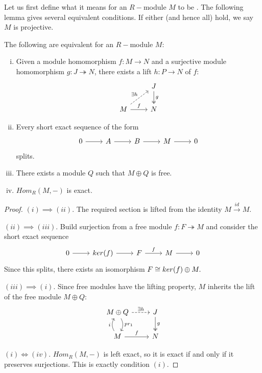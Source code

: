 Let us first define what it means for an $R-$module $M$ to be . The following lemma gives several equivalent conditions. If either (and hence all) hold, we say $M$ is projective.
\begin{lemma} The following are equivalent for an $R-$module $M$:
\begin{enumerate}[(i)]
    \item Given a module homomorphism $f:M\rightarrow N$ and a surjective module homomorphism $g:J 	\twoheadrightarrow N$, there exists a lift $h:P\rightarrow N$ of $f$:
\[\begin{tikzcd}
                                                 & J \arrow[d, "g", two heads] \\
M \arrow[r, "f"] \arrow[ru, "\exists h", dashed] & N               
\end{tikzcd}\]
\item Every short exact sequence of the form
\[\begin{tikzcd}
0 \arrow[r] & A \arrow[r] & B \arrow[r] & M \arrow[r] & 0
\end{tikzcd}\]
splits.
\item There exists a module $Q$ such that $M\oplus Q$ is free.
\item $Hom_R(M,-)$ is exact.
\end{enumerate}
\end{lemma}
\begin{proof}

$(i)\implies (ii)$. The required section is lifted from the identity $M\xrightarrow{id}M$.

$(ii)\implies (iii)$. Build surjection from a free module $f:F\twoheadrightarrow M$ and consider the short exact sequence
\[\begin{tikzcd}
0 \arrow[r] & ker(f) \arrow[r] & F \arrow[r, "f"] & M \arrow[r] & 0
\end{tikzcd}\]
Since this splits, there exists an isomorphism $F\cong ker(f)\oplus M.$

$(iii) \implies (i)$. Since free modules have the lifting property, $M$ inherits the lift of the free module $M\oplus Q$: %
\[\begin{tikzcd}
M\oplus Q \arrow[d, "pr_1", bend left] \arrow[r, "\exists h", dashed] & J \arrow[d, "g", two heads] \\
M \arrow[u, "i", bend left] \arrow[r, "f"]                            & N                          
\end{tikzcd}\]

$(i)\iff (iv)$. $Hom_R(M,-)$ is left exact, so it is exact if and only if it preserves surjections. This is exactly condition $(i)$.
\end{proof}

